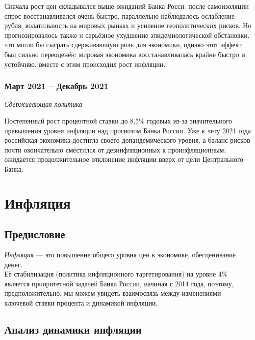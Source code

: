\noindent
Сначала рост цен складывался выше ожиданий Банка Росси: после самоизоляции спрос восстанавливался очень быстро, параллельно наблюдалось ослабление рубля, волатильность на мировых рынках и усиление геополитических рисков. Но прогнозировалось также и серьёзное ухудшение эпидемиологической обстановки, что могло бы сыграть сдерживающую роль для экономики, однако этот эффект был сильно переоценён: мировая экономика восстанавливалась крайне быстро и устойчиво, вместе с этим происходил рост инфляции.

\subsubsection*{Март 2021 – Декабрь 2021}
\noindent
\emph{Сдерживающая политика}

\noindent
Постепенный рост процентной ставки до 8,5\% годовых из-за значительного превышения уровня инфляции над прогнозом Банка России. Уже к лету 2021 года российская экономика достигла своего допандемического уровня, а баланс рисков почти окончательно сместился от дезинфляционных к проинфляционным; ожидается продолжительное отклонение инфляции вверх от цели Центрального Банка.


\newpage


\section{Инфляция}

\subsection{Предисловие}
\noindent
\textit{Инфляция} — это повышение общего уровня цен в экономике, обесценивание денег. \\Её стабилизация (политика инфляционного таргетирования) на уровне 4\% является приоритетной задачей Банка России, начиная с 2014 года, поэтому, предположительно, мы можем увидеть взаимосвязь между изменениями ключевой ставки процента и динамикой инфляции.
\subsection{Анализ динамики инфляции}

